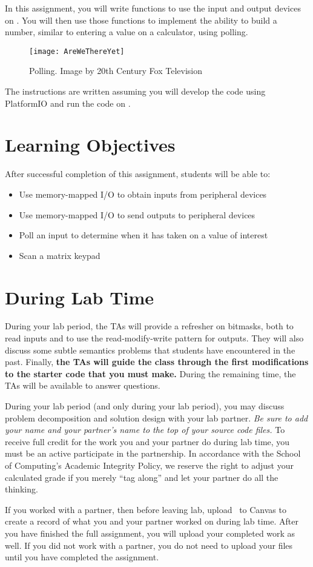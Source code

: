 In this assignment, you will write functions to use the input and output devices on \runtimeenvironment.
You will then use those functions to implement the ability to build a number, similar to entering a value on a calculator, using polling.

\begin{figure}[h]
    \centering
    \texttt{[image: AreWeThereYet]}
    \caption{Polling. \tiny Image by 20th Century Fox Television}
\end{figure}

The instructions are written assuming you will develop the code using PlatformIO    %
and run the code on \runtimeenvironment.

\tableofcontents

\section*{Learning Objectives}

After successful completion of this assignment, students will be able to:
\begin{itemize}
    \item Use memory-mapped I/O to obtain inputs from peripheral devices
    \item Use memory-mapped I/O to send outputs to peripheral devices
    \item Poll an input to determine when it has taken on a value of interest
    \item Scan a matrix keypad
\end{itemize}

\section*{During Lab Time}

During your lab period, the TAs will provide a refresher on bitmasks, both to read inputs and to use the read-modify-write pattern for outputs.
They will also discuss some subtle semantics problems that students have encountered in the past.
Finally, \textbf{the TAs will guide the class through the first modifications to the starter code that you must make.}
During the remaining time, the TAs will be available to answer questions.

During your lab period (and only during your lab period), you may discuss problem decomposition and solution design with your lab partner.
\textit{Be sure to add your name and your partner's name to the top of your source code files.}
To receive full credit for the work you and your partner do during lab time, you must be an active participate in the partnership.
In accordance with the School of Computing's Academic Integrity Policy, we reserve the right to adjust your calculated grade if you merely ``tag along'' and let your partner do all the thinking.

If you worked with a partner, then before leaving lab, upload \requiredfiles\ to Canvas to create a record of what you and your partner worked on during lab time.
After you have finished the full assignment, you will upload your completed work as well.
If you did not work with a partner, you do not need to upload your files until you have completed the assignment.
